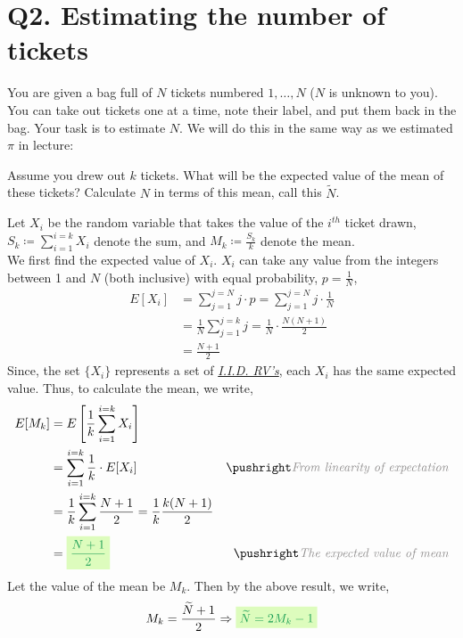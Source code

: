 \documentclass[12pt,titlepage]{report}
\begin{document}
\section*{\hypertarget{q2}{Q2. Estimating the number of tickets}}

You are given a bag full of $N$ tickets numbered $1, \dots , N$ ($N$ is unknown to you). You can take out tickets one at a time, note their label, and put them back in the bag. Your task is to estimate $N$. We will do this in the same way as we estimated $\pi$ in lecture:

\begin{enumerate}[label=(\alph*)]
    \hypertarget{q2a}{\item} Assume you drew out $k$ tickets. What will be the expected value of the mean of these tickets? Calculate $N$ in terms of this mean, call this $\widetilde{N}$.
    \item[\underline{\textit{Solution:}}] Let $X_i$ be the random variable that takes the value of the $i^{th}$ ticket drawn, $S_k\coloneqq \sum_{i=1}^{i=k} X_i$ denote the sum, and $M_k\coloneqq\frac{S_k}{k}$ denote the mean. \\
    We first find the expected value of $X_i$. $X_i$ can take any value from the integers between 1 and $N$ (both inclusive) with equal probability, $p=\frac{1}{N}$,
    \begin{align*}
        E[X_i] &= \sum_{j=1}^{j=N} j\cdot p = \sum_{j=1}^{j=N} j \cdot \frac{1}{N}\\
        &= \frac{1}{N} \sum_{j=1}^{j=k} j = \frac{1}{N} \cdot \frac{N(N+1)}{2} \\
        &= \boxed{\frac{N+1}{2}}
    \end{align*}
    Since, the set $\{X_i\}$ represents a set of \href{https://en.wikipedia.org/wiki/Independent_and_identically_distributed_random_variables}{\color{Cerulean} \textit{I.I.D. RV's}}, each $X_i$ has the same expected value. Thus, to calculate the mean, we write,
    \begin{align*}
        E[M_k] &= E\left[\frac{1}{k}\sum_{i=1}^{i=k} X_i\right] \\
        &= \sum_{i=1}^{i=k} \frac{1}{k}\cdot E[X_i] \comment{\color{Gray} \textit{From linearity of expectation}} \\
        &= \frac{1}{k} \sum_{i=1}^{i=k} \frac{N+1}{2} = \frac{1}{k} \frac{k(N+1)}{2}\\
        &= \ans{$\dfrac{N+1}{2}$} \comment{\textit{The expected value of mean}}
    \end{align*}
    Let the value of the mean be $M_k$. Then by the above result, we write,
    \begin{align*}
        M_k=\frac{\widetilde{N}+1}{2} \Rightarrow \ans{$\widetilde{N}=2M_k-1$}
    \end{align*}
    

\end{enumerate}
\end{document}
